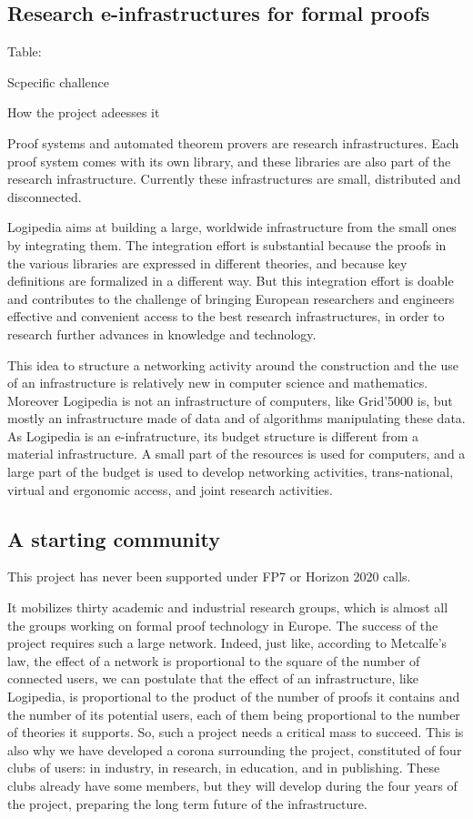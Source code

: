 \subsection{Research e-infrastructures for formal proofs}


{\color{red} Table:

  Scpecific challence

  How the project adeesses it}



Proof systems and automated theorem provers are research
infrastructures. Each proof system comes with its own library, and
these libraries are also part of the research infrastructure.  Currently
these infrastructures are small, distributed and disconnected.

Logipedia aims at building a large, worldwide infrastructure from the
small ones by integrating them.  The integration effort is substantial
because the proofs in the various libraries are expressed in different
theories, and because key definitions are formalized in a different
way.  But this integration effort is doable and contributes to the
challenge of bringing European researchers and engineers effective and
convenient access to the best research infrastructures, in order to
research further advances in knowledge and technology.

This idea to structure a networking activity around the construction
and the use of an infrastructure is relatively new in computer science
and mathematics. Moreover Logipedia is not an infrastructure of
computers, like Grid'5000 is, but mostly an infrastructure made of
data and of algorithms manipulating these data.  As Logipedia is an
e-infratructure, its budget structure is different from a material
infrastructure. A small part of the resources is used for computers,
and a large part of the budget is used to develop networking
activities, trans-national, virtual and ergonomic access, and joint
research activities.

\subsection{A starting community}

This project has never been supported under FP7 or Horizon 2020 calls.

It mobilizes thirty academic and industrial research groups, which is
almost all the groups working on formal proof technology in Europe.
The success of the project requires such a large network.  Indeed,
just like, according to Metcalfe's law, the effect of a network is
proportional to the square of the number of connected users, we can
postulate that the effect of an infrastructure, like Logipedia, is
proportional to the product of the number of proofs it contains and
the number of its potential users, each of them being proportional to
the number of theories it supports. So, such a project needs a
critical mass to succeed. This is also why we have developed a corona
surrounding the project, constituted of four clubs of users: in
industry, in research, in education, and in publishing. These clubs
already have some members, but they will develop during the four years
of the project, preparing the long term future of the infrastructure.

